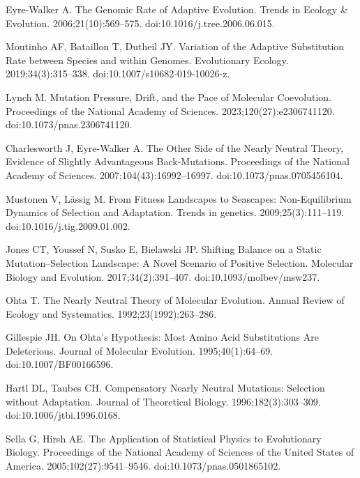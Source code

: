 \documentclass[10pt,letterpaper]{article}
\begin{document}
\begin{thebibliography}{10}
{Eyre-Walker} A.
\newblock The Genomic Rate of Adaptive Evolution.
\newblock Trends in Ecology \& Evolution. 2006;21(10):569--575.
\newblock doi:{10.1016/j.tree.2006.06.015}.

Moutinho AF, Bataillon T, Dutheil JY.
\newblock Variation of the Adaptive Substitution Rate between Species and
within Genomes.
\newblock Evolutionary Ecology. 2019;34(3):315--338.
\newblock doi:{10.1007/s10682-019-10026-z}.

Lynch M.
\newblock Mutation Pressure, Drift, and the Pace of Molecular Coevolution.
\newblock Proceedings of the National Academy of Sciences.
2023;120(27):e2306741120.
\newblock doi:{10.1073/pnas.2306741120}.

Charlesworth J, {Eyre-Walker} A.
\newblock The Other Side of the Nearly Neutral Theory, Evidence of Slightly
Advantageous Back-Mutations.
\newblock Proceedings of the National Academy of Sciences.
2007;104(43):16992--16997.
\newblock doi:{10.1073/pnas.0705456104}.

Mustonen V, L{\"a}ssig M.
\newblock From Fitness Landscapes to Seascapes: Non-Equilibrium Dynamics of
Selection and Adaptation.
\newblock Trends in genetics. 2009;25(3):111--119.
\newblock doi:{10.1016/j.tig.2009.01.002}.

Jones CT, Youssef N, Susko E, Bielawski JP.
\newblock Shifting Balance on a Static Mutation--Selection Landscape: A Novel
Scenario of Positive Selection.
\newblock Molecular Biology and Evolution. 2017;34(2):391--407.
\newblock doi:{10.1093/molbev/msw237}.

Ohta T.
\newblock The Nearly Neutral Theory of Molecular Evolution.
\newblock Annual Review of Ecology and Systematics. 1992;23(1992):263--286.

Gillespie JH.
\newblock On {{Ohta}}'s Hypothesis: {{Most}} Amino Acid Substitutions Are
Deleterious.
\newblock Journal of Molecular Evolution. 1995;40(1):64--69.
\newblock doi:{10.1007/BF00166596}.

Hartl DL, Taubes CH.
\newblock Compensatory Nearly Neutral Mutations: {{Selection}} without
Adaptation.
\newblock Journal of Theoretical Biology. 1996;182(3):303--309.
\newblock doi:{10.1006/jtbi.1996.0168}.

Sella G, Hirsh AE.
\newblock The Application of Statistical Physics to Evolutionary Biology.
\newblock Proceedings of the National Academy of Sciences of the United States
of America. 2005;102(27):9541--9546.
\newblock doi:{10.1073/pnas.0501865102}.


\end{thebibliography}
\end{document}
